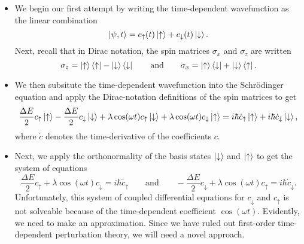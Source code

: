 \documentclass[11pt, a4paper]{article}
\newcommand{\eqtext}[1]{\qquad \text{#1} \qquad}
\newcommand{\Schro}{Schr\"{o}dinger\xspace}
\newcommand{\p}{\psi}  %
\newcommand{\ua}{\uparrow}  %
\newcommand{\da}{\downarrow}  %
\begin{document}
\begin{itemize}
	\item We begin our first attempt by writing the time-dependent wavefunction as the linear combination
	\begin{equation*}
		\ket{\p, t} = c_{\ua}(t)\ket{\ua} + c_{\da}(t)\ket{\da}.
	\end{equation*}
    Next, recall that in Dirac notation, the spin matrices $ \sigma_{x} $ and $ \sigma_{z} $ are written
	\begin{equation*}
		\sigma_{z} = \ket{\ua}\bra{\ua} - \ket{\da}\bra{\da} \eqtext{and} \sigma_{x} = \ket{\ua}\bra{\da} + \ket{\da}\bra{\ua}.
	\end{equation*}
	
    \item We then subsitute the time-dependent wavefunction into the \Schro equation and apply the Dirac-notation definitions of the spin matrices to get
	\begin{equation*}
        \frac{\Delta E}{2}c_{\ua}\ket{\ua} - \frac{\Delta E}{2}c_{\da}\ket{\da} + \lambda \cos (\omega t) c_{\ua}\ket{\da} + \lambda \cos (\omega t) c_{\da}\ket{\ua} = i \hbar \dot{c}_{\ua}\ket{\ua} + i \hbar \dot{c}_{\da}\ket{\da},
	\end{equation*}
    where $ \dot{c} $ denotes the time-derivative of the coefficients $ c $.

    \item Next, we apply the orthonormality of the basis states $ \ket{\da} $ and $ \ket{\ua} $ to get the system of equations
	\begin{equation*}
        \frac{\Delta E}{2}c_{\ua} + \lambda \cos(\omega t) c_{\da} = i \hbar \dot{c}_{\ua} \eqtext{and} -\frac{\Delta E}{2}c_{\da} + \lambda \cos (\omega t) c_{\ua} = i \hbar \dot{c}_{\da}.
	\end{equation*}
    Unfortunately, this system of coupled differential equations for $ c_{\da} $ and $ c_{\ua} $ is not solveable because of the time-dependent coefficient $ \cos(\omega t) $. Evidently, we need to make an approximation. Since we have ruled out first-order time-dependent perturbation theory, we will need a novel approach.
\end{itemize}
\end{document}
